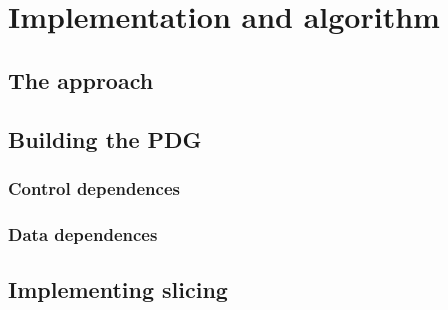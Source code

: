 \documentclass[oneside,12pt,a4paper]{book}
\begin{document}
\chapter{Implementation and algorithm}
\section{The approach}
\section{Building the PDG}
\subsection{Control dependences}
\subsection{Data dependences}

\section{Implementing slicing}
\end{document}
